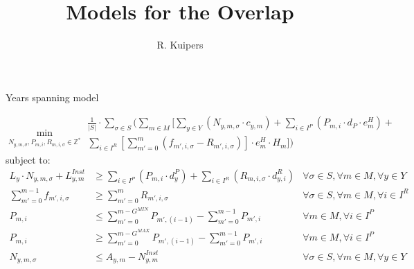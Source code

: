 \documentclass{beamer}
\title[Models for the Overlap]{Models for the Overlap}
\author{R. Kuipers}
\begin{document}

\begin{frame}{Years spanning model}
\scriptsize

\begin{equation}
	\min_{N_{y,m,\sigma}, P_{m,i}, R_{m,i,\sigma} \in \mathbb{Z}^*}
	\begin{aligned}
	\frac{1}{|S|} \cdot \sum_{\sigma \in S} ( \sum_{m \in M} [\sum_{y \in Y} 
	(N_{y,m,\sigma} \cdot c_{y,m}) +  
	\sum_{i \in I^P} (P_{m,i} \cdot d_P \cdot e^H_m) + \\
	\sum_{i \in I^R}[\sum_{m' = 0}^{m} (f_{m',i,\sigma} - R_{m',i,\sigma})] \cdot e^H_m \cdot H_m ])
	\end{aligned}	
\end{equation}
subject to:
\begin{align}
L_y \cdot N_{y,m,\sigma} + L^{Inst}_{y,m}	&\geq 	\sum_{i \in I^P} (P_{m,i} \cdot d^P_y) + \sum_{i \in I^R} (R_{m,i,\sigma} \cdot d^R_{y,i})  	
																					& \forall \sigma \in S, \forall m \in M, \forall y \in Y 	\\
\sum_{m' = 0}^{m-1} f_{m',i,\sigma}		&\geq 	\sum_{m' = 0}^m R_{m',i,\sigma}							& \forall \sigma \in S, \forall m \in M, \forall i \in I^R	\\
P_{m,i} 						&\leq 		\sum_{m' = 0}^{m-G^{MIN}} P_{m',(i-1)} - \sum_{m' = 0}^{m-1} P_{m',i}	& \forall m \in M, \forall i \in I^P 				\\
P_{m,i} 						&\geq	 	\sum_{m' = 0}^{m-G^{MAX}} P_{m',(i-1)} - \sum_{m' = 0}^{m-1} P_{m',i}	& \forall m \in M, \forall i \in I^P 				\\
N_{y,m,\sigma}					&\leq		A_{y,m} - N^{Inst}_{y,m}								& \forall \sigma \in S, \forall m \in M, \forall y \in Y
\end{align}

\end{frame}
\end{document}
